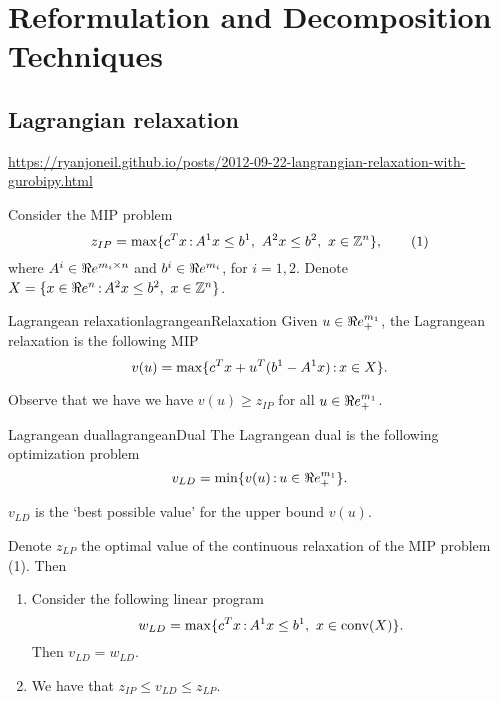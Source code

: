 

%
%
\chapter{Reformulation and Decomposition Techniques}

\section{Lagrangian relaxation}
\begin{resource}
\href{Blog on Lagrangian Relaxation with Gurobipy}{https://ryanjoneil.github.io/posts/2012-09-22-langrangian-relaxation-with-gurobipy.html}
\end{resource}

Consider the MIP problem
$$z_{IP}=\max \{ c^Tx{\,:\,} A^1x\leq b^1,\ A^2x\leq b^2,\ x\in{\mathbb{Z}}^n\},\qquad (1)$$
where $A^i\in\Re e^{m_i\times n}$ and $b^i\in\Re e^{m_i}$, for $i=1,2$. Denote $X=\{x\in\R^n\tq A^2x\leq b^2,\ x\in\Z^n\}$.

\begin{definition}{Lagrangean relaxation}{lagrangeanRelaxation} Given $u\in\Re e^{m_1}_+$, the Lagrangean relaxation is the following MIP
$$v(u)=\max \{c^Tx+ u^T(b^1-A^1x){\,:\,} x\in X\}.$$
\end{definition}

\begin{remark}{}{}
Observe that we have  we have $v(u)\geq z_{IP}$ for all $u\in\Re e^{m_1}_+$.
\end{remark}

\begin{definition}{Lagrangean dual}{lagrangeanDual} The Lagrangean dual is the following optimization  problem
$$v_{LD}=\min\{v(u){\,:\,} u\in\Re e^{m_1}_+\}.$$
\end{definition}

\begin{remark}{}{}
$v_{LD}$ is the `best possible value' for the upper bound $v(u)$.
\end{remark}

\begin{theorem}{}{} Denote $z_{LP}$ the optimal value of the continuous relaxation of the MIP problem (1). Then
\begin{enumerate}
\item  Consider the following linear program
	$$w_{LD}=\max\{c^Tx\tq A^1x\leq b^1,\ x\in\conv(X)\}.$$
	Then $v_{LD}=w_{LD}$. 
	\item We have that $z_{IP}\leq v_{LD} \leq z_{LP}$.
\end{enumerate}
\end{theorem}

